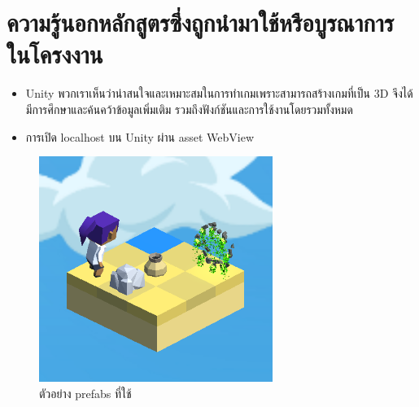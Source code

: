 \section{ความรู้นอกหลักสูตรซึ่งถูกนำมาใช้หรือบูรณาการในโครงงาน}
\begin{itemize}
  \item Unity พวกเราเห็นว่าน่าสนใจและเหมาะสมในการทำเกมเพราะสามารถสร้างเกมที่เป็น 3D จึงได้มีการศึกษาและค้นคว้าข้อมูลเพิ่มเติม รวมถึงฟังก์ชันและการใช้งานโดยรวมทั้งหมด
  \item การเปิด localhost บน Unity ผ่าน asset WebView
\end{itemize}

\begin{figure}[h!]
\begin{center}
\includegraphics{pic/prefabs.png}
\end{center}
\caption[ตัวอย่าง prefabs ที่ใช้]{ตัวอย่าง prefabs ที่ใช้ }
\label{prefabs}
\end{figure}
